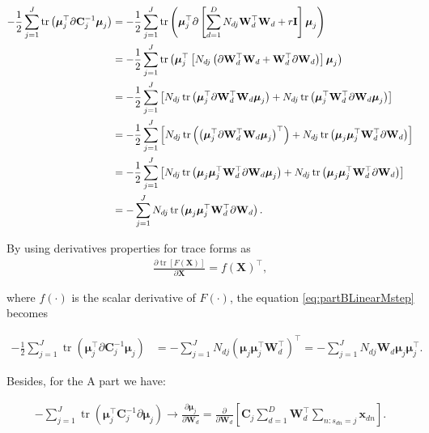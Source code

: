 \documentclass[]{article}
\newcommand{\tr}{\operatorname{tr}}
\newcommand{\Cin}{\mathbf{C}_j}
\newcommand{\muJ}{\boldsymbol{\mu}_j}
\newcommand{\indobj}{\mathbf{x}_{dn}}
\newcommand{\projMatI}{\mathbf{W}_d}
\begin{document}
\begin{align}
-\frac{1}{2}\sum_{j=1}^{J} \tr\left( \muJ^\top\partial\Cin^{-1}\muJ\right) &= -\frac{1}{2}\sum_{j=1}^{J} \tr\left( \muJ^\top\partial\left[\sum_{d=1}^{D}N_{dj}\projMatI^\top\projMatI+r\mathbf{I}\right]\muJ\right) \notag \\
&=  -\frac{1}{2}\sum_{j=1}^{J} \tr\left( \muJ^\top\left[N_{dj}\left(\partial\projMatI^\top\projMatI+\projMatI^\top\partial\projMatI\right)\right]\muJ\right) \notag \\
&=  -\frac{1}{2}\sum_{j=1}^{J} \left[N_{dj}\tr\left( \muJ^\top\partial\projMatI^\top\projMatI\muJ\right)+N_{dj}\tr\left(\muJ^\top\projMatI^\top\partial\projMatI\muJ\right)\right] \notag \\
&=  -\frac{1}{2}\sum_{j=1}^{J} \left[N_{dj}\tr\left( \left(\muJ^\top\partial\projMatI^\top\projMatI\muJ\right)^\top\right)+N_{dj}\tr\left(\muJ\muJ^\top\projMatI^\top\partial\projMatI\right)\right] \notag\\
&=  -\frac{1}{2}\sum_{j=1}^{J} \left[N_{dj}\tr\left( \muJ\muJ^\top\projMatI^\top\partial\projMatI\muJ\right)+N_{dj}\tr\left(\muJ\muJ^\top\projMatI^\top\partial\projMatI\right)\right] \notag\\
&=  -\sum_{j=1}^{J} N_{dj}\tr\left( \muJ\muJ^\top\projMatI^\top\partial\projMatI\right).
\label{eq:partBLinearMstep}
\end{align}


By using derivatives properties for trace forms as 
\begin{align}
\frac{\partial \tr\left[F\left(\mathbf{X}\right)\right]}{\partial \mathbf{X}} = f\left(\mathbf{X}\right)^\top,
\end{align}

where $f\left(\cdot\right)$ is the scalar derivative of $F\left(\cdot\right)$, the equation \eqref{eq:partBLinearMstep} becomes

\begin{align}
-\frac{1}{2}\sum_{j=1}^{J} \tr\left( \muJ^\top\partial\Cin^{-1}\muJ\right) &= -\sum_{j=1}^{J} N_{dj}\left( \muJ\muJ^\top\projMatI^\top\right)^\top =  -\sum_{j=1}^{J} N_{dj} \projMatI \muJ\muJ^\top.
\end{align}

Besides, for the A part we have:

\begin{align}
-\sum_{j=1}^{J}\tr\left( \muJ^\top\Cin^{-1}\partial\muJ\right) \rightarrow \frac{\partial \muJ}{\partial \projMatI} = \frac{\partial}{\partial \projMatI}\left[\Cin\sum_{d=1}^{D}\projMatI^\top\sum_{n:s_{dn}=j}\indobj\right].
\end{align}
\end{document}
